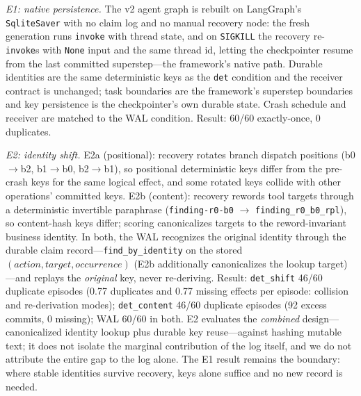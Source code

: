 \documentclass[10pt,journal,compsoc]{IEEEtran}
\begin{document}
\emph{E1: native persistence.} The v2 agent graph is rebuilt on
LangGraph's \texttt{SqliteSaver} with no claim log and no manual
recovery node: the fresh generation runs \texttt{invoke} with thread
state, and on \texttt{SIGKILL} the recovery re-\texttt{invoke}s with
\texttt{None} input and the same thread id, letting the checkpointer
resume from the last committed superstep---the framework's native
path. Durable identities are the same deterministic keys as the
\texttt{det} condition and the receiver contract is unchanged; task
boundaries are the framework's superstep boundaries and key
persistence is the checkpointer's own durable state. Crash schedule
and receiver are matched to the WAL condition. Result: 60/60
exactly-once, 0 duplicates.

\emph{E2: identity shift.} E2a (positional): recovery rotates branch
dispatch positions (b0$\to$b2, b1$\to$b0, b2$\to$b1), so positional
deterministic keys differ from the pre-crash keys for the same
logical effect, and some rotated keys collide with other
operations' committed keys. E2b (content): recovery rewords tool
targets through a deterministic invertible paraphrase
(\texttt{finding-r0-b0} $\to$ \texttt{finding\_r0\_b0\_rpl}), so
content-hash keys differ; scoring canonicalizes targets to the
reword-invariant business identity. In both, the WAL recognizes the
original identity through the durable claim record---\texttt{find\_by\_identity}
on the stored $(\mathit{action}, \mathit{target},
\mathit{occurrence})$ (E2b additionally canonicalizes the lookup
target)---and replays the \emph{original} key, never re-deriving.
Result: \texttt{det\_shift} 46/60 duplicate episodes (0.77
duplicates and 0.77 missing effects per episode: collision and
re-derivation modes); \texttt{det\_content} 46/60 duplicate
episodes (92 excess commits, 0 missing); WAL 60/60 in both. E2
evaluates the \emph{combined} design---canonicalized identity
lookup plus durable key reuse---against hashing mutable text; it
does not isolate the marginal contribution of the log itself, and
we do not attribute the entire gap to the log alone. The E1 result
remains the boundary: where stable identities survive recovery,
keys alone suffice and no new record is needed.
\end{document}
